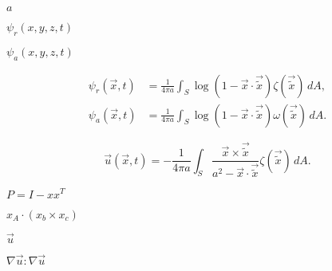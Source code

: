 \documentclass{article}
\begin{document}
$ a $
\pagebreak

$ \psi_r(x,y,z,t) $
\pagebreak

$ \psi_a(x,y,z,t) $
\pagebreak

\begin{align*} \psi_r(\vec{x},t) &= \frac{1}{4\pi a}\int_{S} \log( 1 - \vec{x} \cdot \vec{\tilde{x}})\zeta(\vec{\tilde{x}})\,dA, \\ \psi_a(\vec{x},t) &= \frac{1}{4\pi a}\int_{S} \log( 1 - \vec{x} \cdot \vec{\tilde{x}})\omega(\vec{\tilde{x}})\,dA. \end{align*}
\pagebreak

\[ \vec{u}(\vec{x},t) = -\frac{1}{4\pi a}\int_{S} \frac{ \vec{x} \times \vec{\tilde{x}} }{a^2 - \vec{x}\cdot\vec{\tilde{x}}} \zeta(\vec{\tilde{x}})\,dA. \]
\pagebreak

$ P = I - x x^T $
\pagebreak

$ x_A \cdot (x_b \times x_c) $
\pagebreak

$\vec{u}$
\pagebreak

$ \nabla\vec{u}:\nabla\vec{u} $
\pagebreak
\end{document}
